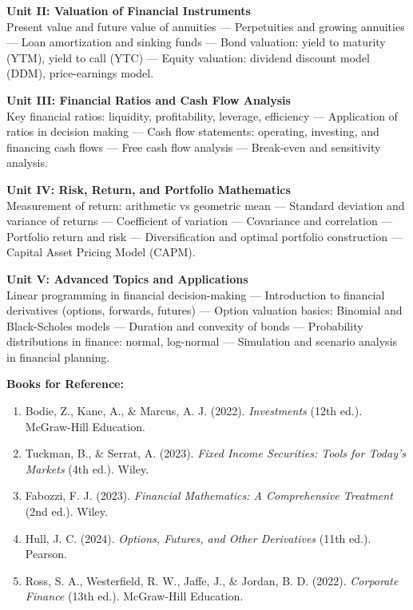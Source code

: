 \vspace{0.3em}
\noindent\textbf{Unit II: Valuation of Financial Instruments}\\
\small
Present value and future value of annuities --- Perpetuities and growing annuities --- Loan amortization and sinking funds --- Bond valuation: yield to maturity (YTM), yield to call (YTC) --- Equity valuation: dividend discount model (DDM), price-earnings model.
\normalsize

\vspace{0.3em}
\noindent\textbf{Unit III: Financial Ratios and Cash Flow Analysis}\\
\small
Key financial ratios: liquidity, profitability, leverage, efficiency --- Application of ratios in decision making --- Cash flow statements: operating, investing, and financing cash flows --- Free cash flow analysis --- Break-even and sensitivity analysis.
\normalsize

\vspace{0.3em}
\noindent\textbf{Unit IV: Risk, Return, and Portfolio Mathematics}\\
\small
Measurement of return: arithmetic vs geometric mean --- Standard deviation and variance of returns --- Coefficient of variation --- Covariance and correlation --- Portfolio return and risk --- Diversification and optimal portfolio construction --- Capital Asset Pricing Model (CAPM).
\normalsize

\vspace{0.3em}
\noindent\textbf{Unit V: Advanced Topics and Applications}\\
\small
Linear programming in financial decision-making --- Introduction to financial derivatives (options, forwards, futures) --- Option valuation basics: Binomial and Black-Scholes models --- Duration and convexity of bonds --- Probability distributions in finance: normal, log-normal --- Simulation and scenario analysis in financial planning.
\normalsize

\vspace{0.5em}
\noindent\textbf{Books for Reference:}
\begin{enumerate}[leftmargin=1.5em, label=\arabic*., itemsep=1pt, topsep=1pt, parsep=0pt]
    \small
    \item Bodie, Z., Kane, A., \& Marcus, A. J. (2022). \textit{Investments} (12th ed.). McGraw-Hill Education.
    \item Tuckman, B., \& Serrat, A. (2023). \textit{Fixed Income Securities: Tools for Today's Markets} (4th ed.). Wiley.
    \item Fabozzi, F. J. (2023). \textit{Financial Mathematics: A Comprehensive Treatment} (2nd ed.). Wiley.
    \item Hull, J. C. (2024). \textit{Options, Futures, and Other Derivatives} (11th ed.). Pearson.
    \item Ross, S. A., Westerfield, R. W., Jaffe, J., \& Jordan, B. D. (2022). \textit{Corporate Finance} (13th ed.). McGraw-Hill Education.
\end{enumerate}

